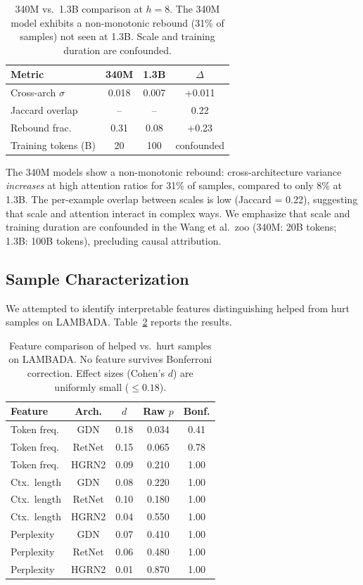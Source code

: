 \documentclass[11pt,a4paper]{article}
\begin{document}
\begin{table}[t]
\centering
\small
\begin{tabular}{lccc}
\toprule
\textbf{Metric} & \textbf{340M} & \textbf{1.3B} & $\Delta$ \\
\midrule
Cross-arch $\sigma$ & 0.018 & 0.007 & +0.011 \\
Jaccard overlap & -- & -- & 0.22 \\
Rebound frac. & 0.31 & 0.08 & +0.23 \\
Training tokens (B) & 20 & 100 & confounded \\
\bottomrule
\end{tabular}
\caption{340M vs.\ 1.3B comparison at $h=8$. The 340M model exhibits a non-monotonic rebound (31\% of samples) not seen at 1.3B. Scale and training duration are confounded.}
\label{tab:scale}
\end{table}

The 340M models show a non-monotonic rebound: cross-architecture variance \emph{increases} at high attention ratios for 31\% of samples, compared to only 8\% at 1.3B.
The per-example overlap between scales is low (Jaccard = 0.22), suggesting that scale and attention interact in complex ways.
We emphasize that scale and training duration are confounded in the Wang et al.\ zoo (340M: 20B tokens; 1.3B: 100B tokens), precluding causal attribution.

\subsection{Sample Characterization}
\label{sec:characterization}

We attempted to identify interpretable features distinguishing helped from hurt samples on LAMBADA.
Table~\ref{tab:features} reports the results.

\begin{table}[t]
\centering
\small
\begin{tabular}{lcccc}
\toprule
\textbf{Feature} & \textbf{Arch.} & $d$ & \textbf{Raw $p$} & \textbf{Bonf.} \\
\midrule
Token freq. & GDN    & 0.18 & 0.034 & 0.41 \\
Token freq. & RetNet & 0.15 & 0.065 & 0.78 \\
Token freq. & HGRN2  & 0.09 & 0.210 & 1.00 \\
Ctx.\ length & GDN   & 0.08 & 0.220 & 1.00 \\
Ctx.\ length & RetNet & 0.10 & 0.180 & 1.00 \\
Ctx.\ length & HGRN2 & 0.04 & 0.550 & 1.00 \\
Perplexity  & GDN    & 0.07 & 0.410 & 1.00 \\
Perplexity  & RetNet & 0.06 & 0.480 & 1.00 \\
Perplexity  & HGRN2  & 0.01 & 0.870 & 1.00 \\
\bottomrule
\end{tabular}
\caption{Feature comparison of helped vs.\ hurt samples on LAMBADA. No feature survives Bonferroni correction. Effect sizes (Cohen's $d$) are uniformly small ($\leq 0.18$).}
\label{tab:features}
\end{table}
\end{document}
